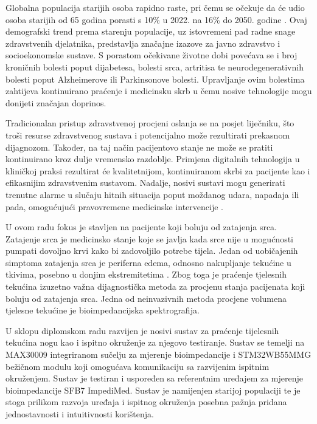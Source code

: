 \documentclass[../diplomski_rad.tex]{subfiles}
\begin{document}
\sloppy

\justifying

Globalna populacija starijih osoba rapidno raste, pri čemu se očekuje da će udio osoba 
starijih od 65 godina porasti s 10\% u 2022. na 16\% do 2050. godine \cite{Chen2023}. 
Ovaj demografski trend prema starenju populacije, uz istovremeni pad radne snage zdravstvenih djelatnika, predstavlja značajne izazove za 
javno zdravstvo i socioekonomske sustave. 
S porastom očekivane životne dobi povećava se i broj kroničnih bolesti poput dijabetesa, 
bolesti srca, artritisa te neurodegenerativnih bolesti poput Alzheimerove ili Parkinsonove bolesti. 
Upravljanje ovim bolestima zahtijeva kontinuirano praćenje i medicinsku skrb u čemu 
nosive tehnologije mogu donijeti značajan doprinos. 

Tradicionalan pristup zdravstvenoj procjeni oslanja se na posjet liječniku, što troši resurse zdravstvenog sustava 
i potencijalno može rezultirati prekasnom dijagnozom. 
Također, na taj način pacijentovo stanje ne može se pratiti kontinuirano kroz dulje vremensko razdoblje.
Primjena digitalnih tehnologija u kliničkoj praksi rezultirat će kvalitetnijom, kontinuiranom skrbi za pacijente kao i 
efikasnijim zdravstvenim sustavom. 
Nadalje, nosivi sustavi mogu generirati trenutne alarme u slučaju hitnih situacija poput moždanog udara, 
napadaja ili pada, omogućujući pravovremene medicinske intervencije \cite{Chen2023}.

U ovom radu fokus je stavljen na pacijente koji boluju od zatajenja srca.
Zatajenje srca je medicinsko stanje koje se javlja kada srce nije u mogućnosti pumpati dovoljno krvi kako bi 
zadovoljilo potrebe tijela. Jedan od uobičajenih simptoma zatajenja srca je periferna edema, odnosno nakupljanje 
tekućine u tkivima, posebno u donjim ekstremitetima \cite{Abassi2022}. Zbog toga je praćenje tjelesnih tekućina izuzetno važna 
dijagnostička metoda za procjenu stanja pacijenata koji boluju od zatajenja srca. Jedna od neinvazivnih metoda 
procjene volumena tjelesne tekućine je bioimpedancijska spektrografija. 

U sklopu diplomskom radu razvijen je nosivi sustav za praćenje tijelesnih tekućina nogu kao i ispitno okruženje za njegovo testiranje. 
Sustav se temelji na MAX30009 integriranom sučelju za mjerenje bioimpedancije i STM32WB55MMG bežičnom modulu koji omogućava komunikaciju 
sa razvijenim ispitnim okruženjem. Sustav je testiran i uspoređen sa referentnim uređajem za mjerenje bioimpedancije SFB7 ImpediMed.
Sustav je namijenjen starijoj populaciji te je stoga prilikom razvoja uređaja i ispitnog okruženja 
posebna pažnja pridana jednostavnosti i intuitivnosti korištenja. 
\end{document}
